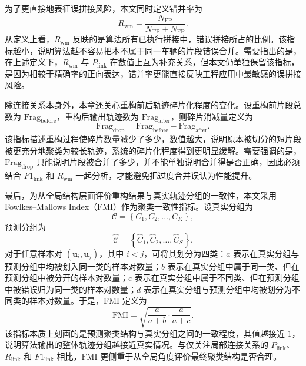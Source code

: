 \documentclass{xdupgthesis}
\begin{document}
为了更直接地表征误拼接风险，本文同时定义错并率为
\begin{equation}
	R_{\mathrm{wm}}
	=
	\frac{N_{\mathrm{FP}}}{N_{\mathrm{TP}}+N_{\mathrm{FP}}}.
\end{equation}
从定义上看，$R_{\mathrm{wm}}$ 反映的是算法所有已执行拼接中，错误拼接所占的比例。该指标越小，说明算法越不容易把本不属于同一车辆的片段错误合并。需要指出的是，在上述定义下，$R_{\mathrm{wm}}$ 与 $P_{\mathrm{link}}$ 在数值上互为补充关系，但本文仍单独保留该指标，是因为相较于精确率的正向表达，错并率更能直接反映工程应用中最敏感的误拼接风险。

除连接关系本身外，本章还关心重构前后轨迹碎片化程度的变化。设重构前片段总数为 $\mathrm{Frag}_{\mathrm{before}}$，重构后输出轨迹数为 $\mathrm{Frag}_{\mathrm{after}}$，则碎片消减量定义为
\begin{equation}
	\mathrm{Frag}_{\mathrm{drop}}
	=
	\mathrm{Frag}_{\mathrm{before}}-\mathrm{Frag}_{\mathrm{after}}.
\end{equation}
该指标描述重构过程使碎片数量减少了多少，数值越大，说明原本被切分的短片段被更充分地聚类为较长轨迹，系统的碎片化程度得到更明显缓解。需要强调的是，$\mathrm{Frag}_{\mathrm{drop}}$ 只能说明片段被合并了多少，并不能单独说明合并得是否正确，因此必须结合 $F1_{\mathrm{link}}$ 和 $R_{\mathrm{wm}}$ 一起分析，才能避免把过度合并误认为性能提升。

最后，为从全局结构层面评价重构结果与真实轨迹分组的一致性，本文采用 Fowlkes--Mallows Index（FMI）作为聚类一致性指标。设真实分组为
\begin{equation}
	\mathcal{C}
	=
	\left\{C_1,C_2,\ldots,C_K\right\},
\end{equation}
预测分组为
\begin{equation}
	\hat{\mathcal{C}}
	=
	\left\{\hat{C}_1,\hat{C}_2,\ldots,\hat{C}_S\right\}.
\end{equation}
对于任意样本对 $\left(\mathbf{u}_i,\mathbf{u}_j\right)$，其中 $i<j$，可将其划分为四类：$a$ 表示在真实分组与预测分组中均被划入同一类的样本对数量；$b$ 表示在真实分组中属于同一类、但在预测分组中被分开的样本对数量；$c$ 表示在真实分组中属于不同类、但在预测分组中被错误归为同一类的样本对数量；$d$ 表示在真实分组与预测分组中均被划分为不同类的样本对数量。于是，FMI 定义为
\begin{equation}
	\mathrm{FMI}
	=
	\sqrt{
		\frac{a}{a+b}
		\cdot
		\frac{a}{a+c}
	}.
\end{equation}
该指标本质上刻画的是预测聚类结构与真实分组之间的一致程度，其值越接近 $1$，说明算法输出的整体轨迹分组越接近真实情况。与仅关注局部连接关系的 $P_{\mathrm{link}}$、$R_{\mathrm{link}}$ 和 $F1_{\mathrm{link}}$ 相比，$\mathrm{FMI}$ 更侧重于从全局角度评价最终聚类结构是否合理。
\end{document}
